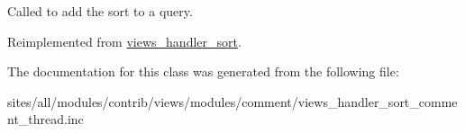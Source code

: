 Called to add the sort to a query. 

Reimplemented from \hyperlink{classviews__handler__sort_94fa33c5d037e41a927583fce2df3d18}{views\_\-handler\_\-sort}.

The documentation for this class was generated from the following file:\begin{CompactItemize}
\item 
sites/all/modules/contrib/views/modules/comment/views\_\-handler\_\-sort\_\-comment\_\-thread.inc\end{CompactItemize}
